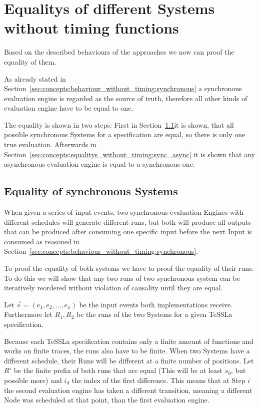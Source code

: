 \section{Equalitys of different Systems without timing functions}
\label{sec:concepts:equalitys_without_timing}

Based on the described behaviours of the approaches we now can proof the equality of them.

As already stated in Section~\ref{sec:concepts:behaviour_without_timing:synchronous} a synchronous evaluation engine is regarded as the source of truth, therefore all other kinds of evaluation engine have to be equal to one.

The equality is shown in two steps: First in Section~\ref{sec:concepts:equalitys_without_timing:synchronous}it is shown, that all possible synchronous Systems for a specification are equal, so there is only one true evaluation.
Afterwards in Section~\ref{sec:concepts:equalitys_without_timing:sync_async} it is shown that any asynchronous evaluation engine is equal to a synchronous one.
\subsection{Equality of synchronous Systems}
\label{sec:concepts:equalitys_without_timing:synchronous}

When given a series of input events, two synchronous evaluation Engines with different schedules will generate different runs,
but both will produce all outputs that can be produced after consuming one specific input
before the next Input is consumed as reasoned in Section~\ref{sec:concepts:behaviour_without_timing:synchronous}.

To proof the equality of both systems we have to proof the equality of their runs.
To do this we will show that any two runs of two synchronous system can be iteratively reordered without violation of causality until they are equal.

Let \(\vec{e} = (e_1, e_2, \dots, e_x)\) be the input events both implementations receive.
Furthermore let \(R_1, R_2\) be the runs of the two Systems for a given TeSSLa specification.

Because each TeSSLa specification contains only a finite amount of functions and works on finite traces, the runs also have to be finite.
When two Systems have a different schedule, their Runs will be different at a finite number of positions.
Let \(R'\) be the finite prefix of both runs that are equal (This will be at least \(s_0\), but possible more) and \(i_d\) the index of the first difference.
This means that at Step \(i\) the second evaluation engine has taken a different transition, meaning a different Node was scheduled at that point, than the first evaluation engine.

